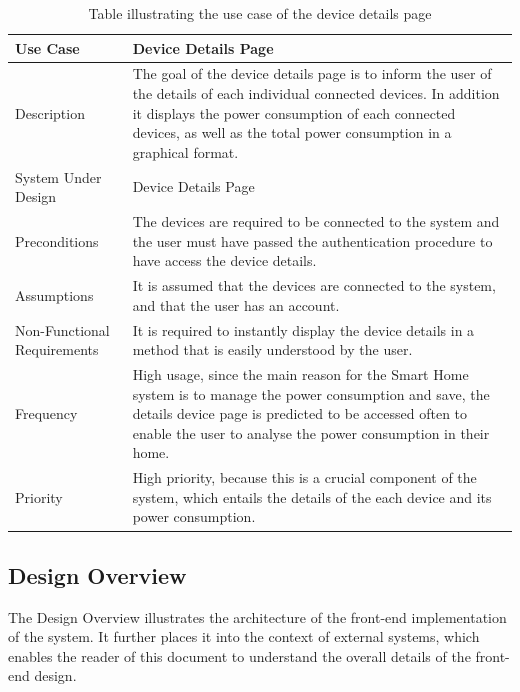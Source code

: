 \documentclass[10pt,twocolumn]{witseiepaper}
\begin{document}
	\begin{table}[H]
		\centering
		\caption{Table illustrating the use case of the device details page}
		\label{device_details_use_case}
		\begin{tabular}{| p{22mm} | p{50mm} |}
			\hline
			\textbf{Use Case} & \textbf{Device Details Page}\\
			\hline
			Description & The goal of the device details page is to inform the user of the details of each individual connected devices. In addition it displays the power consumption of each connected devices, as well as the total power consumption in a graphical format.\\
			\hline
			System Under Design & Device Details Page \\
			\hline
			Preconditions & The devices are required to be connected to the system and the user must have passed the authentication procedure to have access the device details. \\
			\hline
			Assumptions & It is assumed that the devices are connected to the system, and that the user has an account. \\
			\hline
			Non-Functional Requirements & It is required to instantly display the device details in a method that is easily understood by the user.\\
			\hline
			Frequency & High usage, since the main reason for the Smart Home system is to manage the power consumption and save, the details device page is predicted to be accessed often to enable the user to analyse the power consumption in their home.\\
			\hline
			Priority & High priority, because this is a crucial component of the system, which entails the details of the each device and its power consumption.\\
			\hline
		\end{tabular}
	\end{table}
	\newpage
	\subsection{Design Overview}
	The Design Overview illustrates the architecture of the front-end implementation of the system. It further places it into the context of external systems, which enables the reader of this document to understand the overall details of the front-end design.
	
\end{document}
